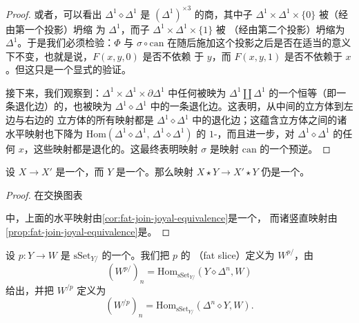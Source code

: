 \begin{proof}
或者，可以看出 $\Delta^1 \diamond \Delta^1$ 是 $(\Delta^1)^{\times 3}$ 的商，其中子%
\trSimplicialSet{} $\Delta^1 \times \Delta^1 \times \{0\}$ 被（经由第一个投影）坍缩
为 $\Delta^1$，而子\trSimplicialSet{} $\Delta^1 \times \Delta^1 \times \{1\}$ 被
（经由第二个投影）坍缩为 $\Delta^1$。于是我们必须检验：$\Phi$ 与
$\sigma \circ \mathrm{can}$ 在随后施加这个投影之后是否在适当的意义下不变，也就是说，$F(x, y, 0)$ 是否不依赖
于 $y$，而 $F(x, y, 1)$ 是否不依赖于 $x$。但这只是一个显式的验证。

接下来，我们观察到：$\Delta^1 \times \Delta^1 \times \partial\Delta^1$ 中任何被映为
$\Delta^1 \amalg \Delta^1$ 的一个恒等（即一条退化边）的\trMorphism{}，也被映为
$\Delta^1 \diamond \Delta^1$ 中的一条退化边。这表明，从中间的立方体到左边与右边的
立方体的所有映射都是 $\Delta^1 \diamond \Delta^1$ 中的退化边；这蕴含立方体之间的诸
水平映射也下降为
$\mathrm{Hom}(\Delta^1 \diamond \Delta^1,\, \Delta^1 \diamond \Delta^1)$
的 $1$-\trSimplex{}，而且进一步，对 $\Delta^1 \diamond \Delta^1$ 的任何%
\trObject{} $x$，这些映射都是退化的。这最终表明映射 $\sigma$ 是映射 $\mathrm{can}$
的一个预逆。
\end{proof}

\begin{corollary}\label{cor:join-joyal-equivalence}
设 $X \to X'$ 是一个\trJoyalEquivalence{}，而 $Y$ 是一个\trSimplicialSet{}。那么映射
$X \star Y \to X' \star Y$ 仍是一个\trJoyalEquivalence{}。
\end{corollary}

\begin{proof}
在交换图表
\begin{center}
\end{center}
中，上面的水平映射由\cref{cor:fat-join-joyal-equivalence}是一个\trJoyalEquivalence{}，
而诸竖直映射由\cref{prop:fat-join-joyal-equivalence}是\trJoyalEquivalence{}。
\end{proof}

\begin{definition}\label{def:fat-slice}
设 $p\colon Y \to W$ 是 $\mathrm{sSet}_{Y/}$ 的一个\trObject{}。我们把 $p$ 的%
\emph{\trFatSlice{}}（fat slice）定义为\trSimplicialSet{} $W^{p/}$，由
\[
(W^{p/})_n = \mathrm{Hom}_{\mathrm{sSet}_{Y/}}(Y \diamond \Delta^n, W)
\]
给出，并把\trSimplicialSet{} $W^{/p}$ 定义为
\[
(W^{/p})_n = \mathrm{Hom}_{\mathrm{sSet}_{Y/}}(\Delta^n \diamond Y, W).
\]
\end{definition}

